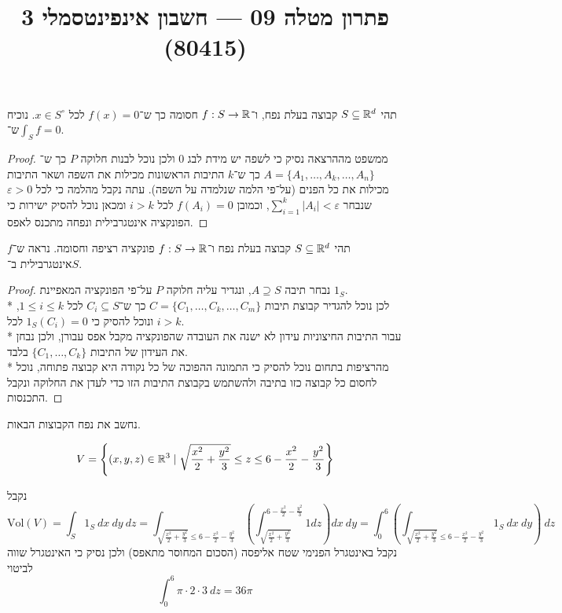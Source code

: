 
\title{פתרון מטלה 09 --- חשבון אינפינטסמלי 3 (80415)}


\maketitle
\maketitleprint{}

\Question{}
תהי $S \subseteq \mathbb{R}^d$ קבוצה בעלת נפח, ו־$f : S \to \mathbb{R}$ חסומה כך ש־$f(x) = 0$ לכל $x \in S^\circ$. נוכיח ש־$\int_S f = 0$.
\begin{proof}
	ממשפט מההרצאה נסיק כי לשפה יש מידת לבג 0 ולכן נוכל לבנות חלוקה $P$ כך ש־$A = \{ A_1, \dots, A_k, \dots, A_n \}$ כך ש־$k$ התיבות הראשונות מכילות את השפה ושאר התיבות מכילות את כל הפנים (על־פי הלמה שנלמדה על השפה).
	עתה נקבל מהלמה כי לכל $\varepsilon > 0$ שנבחר $\sum_{i = 1}^{k} |A_i| < \varepsilon$, וכמובן $f(A_i) = 0$ לכל $i > k$ ומכאן נוכל להסיק ישירות כי הפונקציה אינטגרבילית ונפחה מתכנס לאפס.
\end{proof}

\Question{}
תהי $S \subseteq \mathbb{R}^d$ קבוצה בעלת נפח ו־$f : S \to \mathbb{R}$ פונקציה רציפה וחסומה. נראה ש־$f$ אינטגרבילית ב־$S$.
\begin{proof}
	נבחר תיבה $A \supseteq S$, ונגדיר עליה חלוקה $P$ על־פי הפונקציה המאפיינת $1_S$. \\*
	לכן נוכל להגדיר קבוצת תיבות $C = \{ C_1, \dots, C_k, \dots, C_m \}$ כך ש־$C_i \subseteq S$ לכל $1 \le i \le k$, ונוכל להסיק כי $1_S(C_i) = 0$ לכל $i > k$. \\*
	עבור התיבות החיצוניות עידון לא ישנה את העובדה שהפונקציה מקבל אפס עבורן, ולכן נבחן את העידון של התיבות $\{ C_1, \dots, C_k \}$ בלבד. \\*
	מהרציפות בתחום נוכל להסיק כי התמונה ההפוכה של כל נקודה היא קבוצה פתוחה, נוכל לחסום כל קבוצה כזו בתיבה ולהשתמש בקבוצת התיבות הזו כדי לעדן את החלוקה ונקבל התכנסות.
\end{proof}

\Question{}
נחשב את נפח הקבוצות הבאות.

\Subquestion{}
\[
	V = \left\{ (x, y, z) \in \mathbb{R}^3 \mid \sqrt{\frac{x^2}{2} + \frac{y^2}{3}} \le z \le 6 - \frac{x^2}{2} - \frac{y^2}{3} \right\}
\]

נקבל
\[
	\text{Vol}(V) = \int_S 1_S\ dx\ dy\ dz
	= \int_{\sqrt{\frac{x^2}{2} + \frac{y^2}{3}} \le 6 - \frac{x^2}{2} - \frac{y^2}{3}} \left( \int_{\sqrt{\frac{x^2}{2} + \frac{y^2}{3}}}^{6 - \frac{x^2}{2} - \frac{y^2}{3}} 1 dz \right) dx\ dy
	= \int_0^6 \left(\int_{\sqrt{\frac{x^2}{2} + \frac{y^2}{3}} \le 6 - \frac{x^2}{2} - \frac{y^2}{3}} 1_S\ dx\ dy\right)\ dz
\]
נקבל באינטגרל הפנימי שטח אליפסה (הסכום המחוסר מתאפס) ולכן נסיק כי האינטגרל שווה לביטוי
\[
	\int_0^6 \pi \cdot 2 \cdot 3\ dz = 36 \pi
\]

